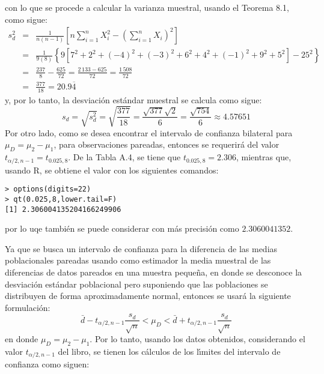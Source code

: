 \begin{solucion}
\begin{equation*}
 \end{equation*}
 con lo que se procede a calcular la varianza muestral, usando el Teorema 8.1, como sigue:
 \begin{eqnarray*}
  s_d^2 & = & \frac{1}{n(n-1)} \left[ n \sum_{i=1}^n X_i^2 - \left( \sum_{i=1}^n X_i \right)^2 \right] \\
  & = & \frac{1}{9(8)} \left\{ 9\left[7^2 + 2^2+ (-4)^2 + (-3)^2 + 6^2 + 4^2 + (-1)^2 + 9^2 + 5^2 \right] - 25^2 \right\} \\
  & = & \frac{237}{8} - \frac{625}{72} = \frac{2\,133 - 625}{72} = \frac{1\,508}{72} \\
  & = & \frac{377}{18} = 20.9\overline{4}
 \end{eqnarray*}
 y, por lo tanto, la desviaci\'on est\'andar muestral se calcula como sigue:
 \begin{equation*}
  s_d = \sqrt{s_d^2} = \sqrt{\frac{377}{18}} = \frac{\sqrt{377}\sqrt{2}}{6} = \frac{\sqrt{754}}{6} \approx 4.57651
 \end{equation*}
 Por otro lado, como se desea encontrar el intervalo de confianza bilateral para $\mu_D = \mu_2 - \mu_1$, para observaciones pareadas, entonces se requerir\'a del valor $t_{\alpha/2,n-1} = t_{0.025,8}$. De la Tabla A.4, se tiene que  $t_{0.025,8} = 2.306$, mientras que, usando R, se obtiene el valor con los siguientes comandos:
 \begin{verbatim}
> options(digits=22)
> qt(0.025,8,lower.tail=F)
[1] 2.306004135204166249906
 \end{verbatim}
 \vspace{-0.5cm}
 por lo uqe tambi\'en se puede considerar con m\'as precisi\'on como $2.3060041352$. 
 \par 
 Ya que se busca un intervalo de confianza para la diferencia de las medias poblacionales pareadas usando como estimador la media muestral de las diferencias de datos pareados en una muestra peque\~na, en donde se desconoce la desviaci\'on est\'andar poblacional pero suponiendo que las poblaciones se distribuyen de forma aproximadamente normal, entonces se usar\'a la siguiente formulaci\'on:
 \begin{equation*}
  \bar{d} - t_{\alpha/2,n-1} \frac{s_d}{\sqrt{n}} < \mu_D < \bar{d} + t_{\alpha/2,n-1} \frac{s_d}{\sqrt{n}}
 \end{equation*}
 en donde $\mu_D = \mu_2 - \mu_1$.
 Por lo tanto, usando los datos obtenidos, considerando el valor $t_{\alpha/2,n-1}$ del libro, se tienen los c\'alculos de los l\'{\i}mites del intervalo de confianza como siguen:
 \begin{eqnarray*}

\end{eqnarray*}
\end{solucion}
